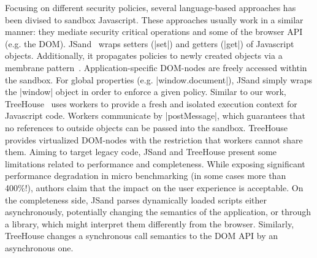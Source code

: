 Focusing on different security policies, several language-based approaches has
been divised to sandbox Javascript.  These approaches usually work in a similar
manner: they mediate security critical operations and some of the browser API
(e.g. the DOM).
JSand~\cite{Agten:2012:JCC} wraps setters (\js|set|) and getters (\js|get|) of Javascript
objects. Additionally, it propagates policies to newly created objects via a
membrane pattern~\cite{RobustComposition}. Application-specific DOM-nodes are freely accessed
withtin the sandbox. For global properties (e.g. \js|window.document|), JSand
simply wraps the \js|window| object in order to enforce a given policy.
Similar to our work, TreeHouse~\cite{Ingram:2012} uses workers to provide a
fresh and isolated execution context for Javascript code. Workers communicate by
\js|postMessage|, which guarantees that no references to outside objects can be
passed into the sandbox. TreeHouse provides virtualized DOM-nodes with the
restriction that workers cannot share them.
Aiming to target legacy code, JSand and TreeHouse present some limitations
related to performance and completeness.
While exposing significant performance degradation in micro benchmarking (in
some cases more than 400\%!), authors claim that the impact on the user
experience is acceptable.
On the completeness side, JSand parses dynamically loaded scripts either
asynchronously, potentially changing the semantics of the application, or
through a library, which might interpret them differently from the
browser. Similarly, TreeHouse changes a synchronous call semantics to the DOM
API by an asynchronous one.


%


